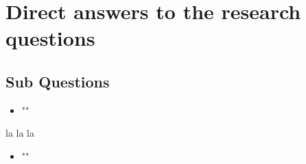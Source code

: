 










\section{Direct answers to the research questions}

\subsection*{Sub Questions}

\begin{itemize}[ ]
  \item "\mySubRQOne"
\end{itemize}

la la la

\begin{itemize}[ ]
  \item "\mySubRQTwo"
\end{itemize}

